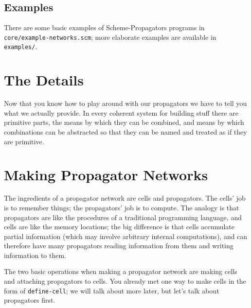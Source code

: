\documentclass[12pt,letterpaper,english]{article}
\begin{document}

\subsection{Examples}
\label{examples}

There are some basic examples of Scheme-Propagators programs in
\texttt{core/example-networks.scm}; more elaborate examples are available
in \texttt{examples/}.



\section{The Details}
\label{the-details}

Now that you know how to play around with our propagators we have to
tell you what we actually provide.  In every coherent system for
building stuff there are primitive parts, the means by which they can
be combined, and means by which combinations can be abstracted so that
they can be named and treated as if they are primitive.



\section{Making Propagator Networks}
\label{making-propagator-networks}

The ingredients of a propagator network are cells and propagators.
The cells' job is to remember things; the propagators' job is to
compute.  The analogy is that propagators are like the procedures of a
traditional programming language, and cells are like the memory
locations; the big difference is that cells accumulate partial
information (which may involve arbitrary internal computations), and
can therefore have many propagators reading information from them and
writing information to them.

The two basic operations when making a propagator network are making
cells and attaching propagators to cells.  You already met one way to
make cells in the form of \texttt{define-cell}; we will talk about more
later, but let's talk about propagators first.


\end{document}
